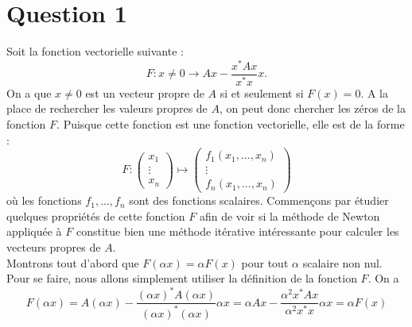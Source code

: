 \section*{Question 1}
Soit la fonction vectorielle suivante : $$F : x \neq 0 \rightarrow Ax - \frac{x^{*}Ax}{x^*x}x.$$
On a que $x \neq 0$ est un vecteur propre de $A$ si et seulement si $F(x)=0$. A la place de rechercher les valeurs propres de $A$, on peut donc chercher les zéros de la fonction $F$. Puisque cette fonction est une fonction vectorielle, elle est de la forme : 
$$F : 
\left(\begin{array}{c}
x_1 \\
\vdots \\
x_n
\end{array}\right)
\longmapsto
\left(\begin{array}{c}
f_1(x_1,...,x_n) \\
\vdots \\
f_n(x_1,...,x_n)
\end{array}\right)
$$
où les fonctions $f_1,...,f_n$ sont des fonctions scalaires. Commençons par étudier quelques propriétés de cette fonction $F$ afin de voir si la méthode de Newton appliquée à $F$ constitue bien une méthode itérative intéressante pour calculer les vecteurs propres de $A$.\\
Montrons tout d'abord que $F(\alpha x) = \alpha F(x)$ pour tout $\alpha$ scalaire non nul.\\
Pour se faire, nous allons simplement utiliser la définition de la fonction $F$. On a $$F(\alpha x) = A(\alpha x) - \frac{(\alpha x)^*A(\alpha x)}{(\alpha x)^*(\alpha x)}\alpha x = \alpha Ax - \frac{\alpha^2 x^* A x}{\alpha^2 x^* x}\alpha x = \alpha F(x)$$

